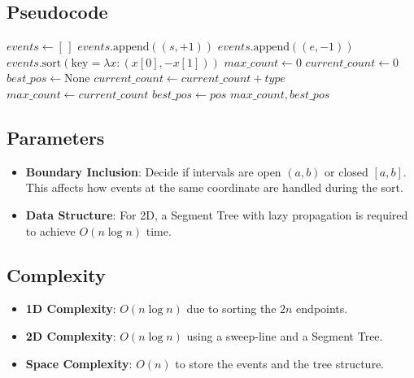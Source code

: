 \subsection{Pseudocode}

\begin{algorithm}[htbp]
\caption{Maximum Overlap (1D Sweep)}
\label{alg:max_overlap_1d}
\begin{algorithmic}[1]
  \State $events \gets [\,]$
    \State $events.\text{append}((s, +1))$
    \State $events.\text{append}((e, -1))$
  \EndFor
  \State $events.\text{sort}(\text{key}=\lambda x: (x[0], -x[1]))$
  \State $max\_count \gets 0$
  \State $current\_count \gets 0$
  \State $best\_pos \gets \text{None}$
    \State $current\_count \gets current\_count + type$
      \State $max\_count \gets current\_count$
      \State $best\_pos \gets pos$
    \EndIf
  \EndFor
  \State \Return $max\_count, best\_pos$
\EndFunction
\end{algorithmic}
\end{algorithm}

\subsection{Parameters}

\begin{itemize}
\item \textbf{Boundary Inclusion}: Decide if intervals are open $(a, b)$ or closed $[a, b]$. This affects how events at the same coordinate are handled during the sort.
\item \textbf{Data Structure}: For 2D, a Segment Tree with lazy propagation is required to achieve $O(n \log n)$ time.
\end{itemize}

\subsection{Complexity}

\begin{itemize}
\item \textbf{1D Complexity}: $O(n \log n)$ due to sorting the $2n$ endpoints.
\item \textbf{2D Complexity}: $O(n \log n)$ using a sweep-line and a Segment Tree.
\item \textbf{Space Complexity}: $O(n)$ to store the events and the tree structure.
\end{itemize}

